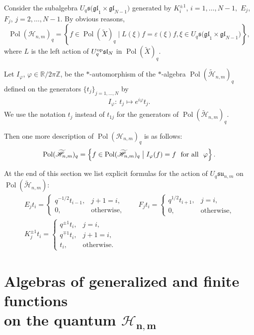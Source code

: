 \documentclass[pdftex]{sigma}
\begin{document}
Consider the subalgebra $U_q \mathfrak{s(gl}_1 \times \mathfrak{gl}_{N-1})$ generated by $K_i^{\pm 1}$,
$i=1,\dots,N-1,$ $E_j$, $F_j$, $j =2,\dots,N-1.$ By obvious reasons,
\[
\operatorname{Pol}(\mathscr{H}_{n,m})_q=\left\{f \in \operatorname{Pol}(\widetilde{X})_q \;\big|\;
L(\xi)f=\varepsilon(\xi)f, \xi \in U_q \mathfrak{s(gl}_1 \times \mathfrak{gl}_{N-1})\right\},
\]
where $L$ is the left action of $U_q^{\rm op} \mathfrak{sl}_N$ in $\operatorname{Pol}(\widetilde{X})_q$.

Let $I_\varphi$, $\varphi\in\mathbb{R}/2\pi\mathbb{Z}$, be the $*$-automorphism of the $*$-algebra
$\operatorname{Pol}(\widetilde{\mathscr{H}}_{n,m})_q$ def\/ined on the generators $\{t_j\}_{j=1,\ldots,N}$ by
\begin{gather}\label{I_phi}
I_\varphi: \ t_j\mapsto e^{i\varphi}t_j.
\end{gather}
We
use the notation $t_j$ instead of $t_{1j}$ for the generators of
$\operatorname{Pol}(\widetilde{\mathscr{H}}_{n,m})_q$.

Then one more description of $\operatorname{Pol}(\mathscr{H}_{n,m})_q$ is as follows:
\[
\operatorname{Pol}(\widetilde{\mathscr{H}}_{n,m})_q = \left\{ f\in
\operatorname{Pol}(\widetilde{\mathscr{H}}_{n,m})_q\; \big| \;I_\varphi(f)=f\text{ \ for all \
}\varphi\right\}.
\]

At the end of this section we list explicit formulas for the action of $U_{q}\mathfrak{su}_{n,m}$ on
$\operatorname{Pol}(\widetilde{\mathscr{H}}_{n,m})$:
\begin{gather*}
E_jt_i =
\begin{cases}
q^{-1/2}t_{i-1}, & j+1=i,
\\ 0, & \text{otherwise},
\end{cases}\qquad
F_jt_i =
\begin{cases}
q^{1/2}t_{i+1}, & j=i,
\\ 0, & \text{otherwise},
\end{cases}
\\ K_j^{\pm 1}t_i  =
\begin{cases}
q^{\pm 1}t_i, & j=i,
\\ q^{\mp 1}t_i, & j+1=i,
\\ t_i, & \text{otherwise}.
\end{cases}
\end{gather*}



\section[Algebras of generalized and finite functions on the quantum $\mathscr{H}_{n,m}$]{Algebras of generalized and f\/inite functions\\ on the quantum $\boldsymbol{\mathscr{H}_{n,m}}$}\label{finite}
\end{document}
